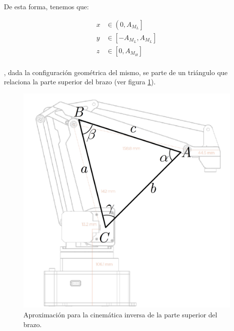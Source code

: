 De esta forma, tenemos que:

\begin{align*}
    x & \in \left(0, A_{M_L}\right] \\
    y & \in \left[-A_{M_L}, A_{M_L}\right] \\
    z & \in \left[0, A_{M_H}\right] \\
\end{align*}


, dada la configuración geométrica del
mismo, se parte de un triángulo que relaciona la parte superior del brazo (ver figura
\ref{fig:ik_pArm_triangle}).

\begin{figure}
    \centering
    \includegraphics[width=.7\linewidth]{pictures/ik_cosine_law_over_arm.png}
    \caption{Aproximación para la cinemática inversa de la parte superior del brazo.}
    \label{fig:ik_pArm_triangle}
\end{figure}